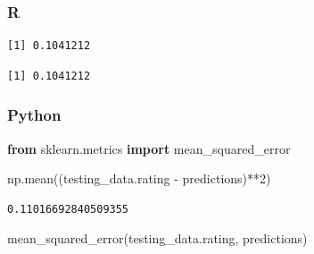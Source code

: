 \documentclass[
  letterpaper,
]{krantz}
\newenvironment{Shaded}{}{}
\newcommand{\DecValTok}[1]{\textcolor[rgb]{0.25,0.63,0.44}{#1}}
\newcommand{\FunctionTok}[1]{\textcolor[rgb]{0.02,0.16,0.49}{#1}}
\newcommand{\ImportTok}[1]{\textcolor[rgb]{0.00,0.50,0.00}{\textbf{#1}}}
\newcommand{\NormalTok}[1]{#1}
\newcommand{\OperatorTok}[1]{\textcolor[rgb]{0.40,0.40,0.40}{#1}}
\newcommand{\SpecialCharTok}[1]{\textcolor[rgb]{0.25,0.44,0.63}{#1}}
\begin{document}
\subsubsection{R}

\begin{Shaded}
\end{Shaded}

\begin{verbatim}
[1] 0.1041212
\end{verbatim}

\begin{Shaded}
\end{Shaded}

\begin{verbatim}
[1] 0.1041212
\end{verbatim}

\subsubsection{Python}

\begin{Shaded}
\begin{Highlighting}[]
\ImportTok{from}\NormalTok{ sklearn.metrics }\ImportTok{import}\NormalTok{ mean\_squared\_error}

\NormalTok{np.mean((testing\_data.rating }\OperatorTok{{-}}\NormalTok{ predictions)}\OperatorTok{**}\DecValTok{2}\NormalTok{)}
\end{Highlighting}
\end{Shaded}

\begin{verbatim}
0.11016692840509355
\end{verbatim}

\begin{Shaded}
\begin{Highlighting}[]
\NormalTok{mean\_squared\_error(testing\_data.rating, predictions)}
\end{Highlighting}
\end{Shaded}
\end{document}
